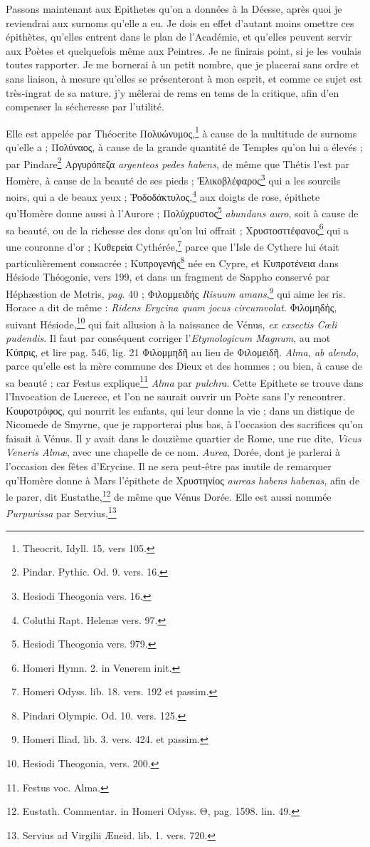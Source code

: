\documentclass[a4paper, 18pt, oneside]{article}
\begin{document}
Passons maintenant aux Epithetes qu'on a données à la Déesse, après quoi je reviendrai aux surnoms qu'elle a eu. Je dois en effet d'autant moins omettre ces épithètes, qu'elles entrent dans le plan de l'Académie, et qu'elles peuvent servir aux Poètes et quelquefois même aux Peintres. Je ne finirais point, si je les voulais toutes rapporter. Je me bornerai à un petit nombre, que je placerai sans ordre et sans liaison, à mesure qu'elles se présenteront à mon esprit, et comme ce sujet est très-ingrat de sa nature, j'y mêlerai de rems en tems de la critique, afin d'en compenser la sécheresse par l'utilité.

Elle est appelée par Théocrite Πολυώνυμος,\footnote{Theocrit. Idyll. 15. vers 105.} à cause de la multitude de surnoms qu'elle a ; Πολύναος, à cause de la grande quantité de Temples qu'on lui a élevés ; par Pindare\footnote{Pindar. Pythic. Od. 9. vers. 16.} Αργυρόπεζα \emph{argenteos pedes habens}, de même que Thétis l'est par Homère, à cause de la beauté de ses pieds ; Ἐλικοβλέφαρος\footnote{Hesiodi Theogonia vers. 16.} qui a les sourcils noirs, qui a de beaux yeux ; Ῥοδοδάκτυλος,\footnote{Coluthi Rapt. Helenæ vers. 97.} aux doigts de rose, épithete qu'Homère donne aussi à l'Aurore ; Πολύχρυστος\footnote{Hesiodi Theogonia vers. 979.} \emph{abundans auro}, soit à cause de sa beauté, ou de la richesse des dons qu'on lui offrait ; Χρυστοσττέφανος\footnote{Homeri Hymn. 2. in Venerem init.} qui a une couronne d'or ; Κυθερεία Cythérée,\footnote{Homeri Odyss. lib. 18. vers. 192 et passim.} parce que l'Isle de Cythere lui était particulièrement consacrée ; Κυπρογενής\footnote{Pindari Olympic. Od. 10. vers. 125.} née en Cypre, et Κυπροτένεια dans Hésiode Théogonie, vers 199, et dans un fragment de Sappho conservé par Héphæstion de Metris, \emph{pag.} 40 ; Φιλομμειδής \emph{Risuum amans},\footnote{Homeri Iliad. lib. 3. vers. 424. et passim.} qui aime les ris. Horace a dit de même : \emph{Ridens Erycina quam jocus circumvolat}. Φιλομηδής, suivant Hésiode,\footnote{Hesiodi Theogonia, vers. 200.} qui fait allusion à la naissance de Vénus, \emph{ex exsectis Cœli pudendis}. Il faut par conséquent corriger l'\emph{Etymologicum Magnum}, au mot Κύπρις, et lire pag. 546, lig. 21 Φιλομμηδῆ au lieu de Φιλομειδῆ. \emph{Alma, ab alendo}, parce qu'elle est la mère commune des Dieux et des hommes ; ou bien, à cause de sa beauté ; car Festus explique\footnote{Festus voc. Alma.} \emph{Alma} par \emph{pulchra}. Cette Epithete se trouve dans l'Invocation de Lucrece, et l'on ne saurait ouvrir un Poète sans l'y rencontrer. Κουροτρόφος, qui nourrit les enfants, qui leur donne la vie ; dans un distique de Nicomede de Smyrne, que je rapporterai plus bas, à l'occasion des sacrifices qu'on faisait à Vénus. Il y avait dans le douzième quartier de Rome, une rue dite, \emph{Vicus Veneris Almæ}, avec une chapelle de ce nom. \emph{Aurea}, Dorée, dont je parlerai à l'occasion des fêtes d'Erycine. Il ne sera peut-être pas inutile de remarquer qu'Homère donne à Mars l'épithete de Χρυστηνίος \emph{aureas habens habenas}, afin de le parer, dit Eustathe,\footnote{Eustath. Commentar. in Homeri Odyss. Θ, pag. 1598. lin. 49.} de même que Vénus Dorée. Elle est aussi nommée \emph{Purpurissa} par Servius,\footnote{Servius ad Virgilii Æneid. lib. 1. vers. 720.} 
\end{document}
